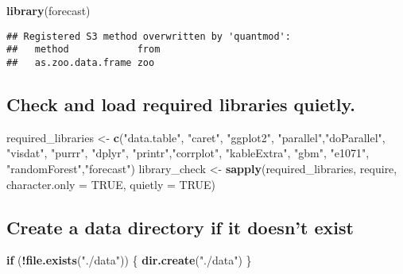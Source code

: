 \documentclass[
]{article}
\newenvironment{Shaded}{\begin{snugshade}}{\end{snugshade}}
\newcommand{\AttributeTok}[1]{\textcolor[rgb]{0.13,0.29,0.53}{#1}}
\newcommand{\ConstantTok}[1]{\textcolor[rgb]{0.56,0.35,0.01}{#1}}
\newcommand{\ControlFlowTok}[1]{\textcolor[rgb]{0.13,0.29,0.53}{\textbf{#1}}}
\newcommand{\FunctionTok}[1]{\textcolor[rgb]{0.13,0.29,0.53}{\textbf{#1}}}
\newcommand{\NormalTok}[1]{#1}
\newcommand{\OtherTok}[1]{\textcolor[rgb]{0.56,0.35,0.01}{#1}}
\newcommand{\SpecialCharTok}[1]{\textcolor[rgb]{0.81,0.36,0.00}{\textbf{#1}}}
\newcommand{\StringTok}[1]{\textcolor[rgb]{0.31,0.60,0.02}{#1}}
\begin{document}
\begin{Shaded}
\begin{Highlighting}[]
\FunctionTok{library}\NormalTok{(forecast)}
\end{Highlighting}
\end{Shaded}

\begin{verbatim}
## Registered S3 method overwritten by 'quantmod':
##   method            from
##   as.zoo.data.frame zoo
\end{verbatim}

\hypertarget{check-and-load-required-libraries-quietly.}{%
\subsection{Check and load required libraries
quietly.}\label{check-and-load-required-libraries-quietly.}}

\begin{Shaded}
\begin{Highlighting}[]
\NormalTok{required\_libraries }\OtherTok{\textless{}{-}} \FunctionTok{c}\NormalTok{(}\StringTok{"data.table"}\NormalTok{, }\StringTok{"caret"}\NormalTok{, }\StringTok{"ggplot2"}\NormalTok{, }\StringTok{"parallel"}\NormalTok{,}\StringTok{"doParallel"}\NormalTok{,}
                        \StringTok{"visdat"}\NormalTok{, }\StringTok{"purrr"}\NormalTok{, }\StringTok{"dplyr"}\NormalTok{, }\StringTok{"printr"}\NormalTok{,}\StringTok{"corrplot"}\NormalTok{,}
                        \StringTok{"kableExtra"}\NormalTok{, }\StringTok{"gbm"}\NormalTok{, }\StringTok{"e1071"}\NormalTok{, }\StringTok{"randomForest"}\NormalTok{,}\StringTok{"forecast"}\NormalTok{)}
\NormalTok{library\_check }\OtherTok{\textless{}{-}} \FunctionTok{sapply}\NormalTok{(required\_libraries, require, }\AttributeTok{character.only =} \ConstantTok{TRUE}\NormalTok{, }
                        \AttributeTok{quietly =} \ConstantTok{TRUE}\NormalTok{)}
\end{Highlighting}
\end{Shaded}

\hypertarget{create-a-data-directory-if-it-doesnt-exist}{%
\subsection{Create a data directory if it doesn't
exist}\label{create-a-data-directory-if-it-doesnt-exist}}

\begin{Shaded}
\begin{Highlighting}[]
\ControlFlowTok{if}\NormalTok{ (}\SpecialCharTok{!}\FunctionTok{file.exists}\NormalTok{(}\StringTok{"./data"}\NormalTok{)) \{}
  \FunctionTok{dir.create}\NormalTok{(}\StringTok{"./data"}\NormalTok{)}
\NormalTok{\}}
\end{Highlighting}
\end{Shaded}
\end{document}
